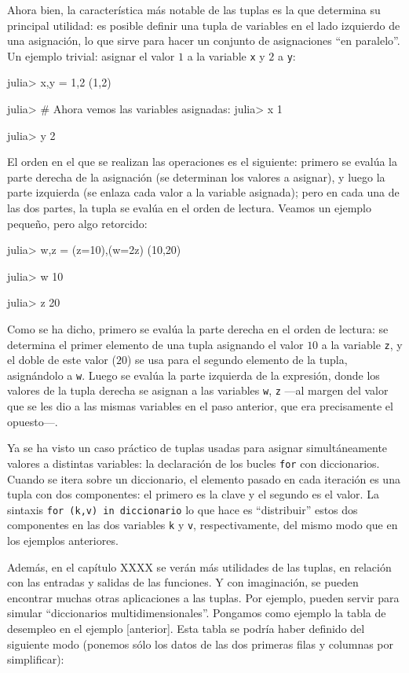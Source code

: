 ﻿\documentclass{article}
\newcommand{\code}{\texttt}
\begin{document}
{Ahora bien, la característica más notable de las tuplas es la que determina su principal utilidad: es posible definir una tupla de variables en el lado izquierdo de una asignación, lo que sirve para hacer un conjunto de asignaciones ``en paralelo''. Un ejemplo trivial: asignar el valor $1$ a la variable \code{x} y $2$ a \code{y}:

julia> x,y = 1,2
(1,2)

julia> # Ahora vemos las variables asignadas:
julia> x
1

julia> y
2

El orden en el que se realizan las operaciones es el siguiente: primero se evalúa la parte derecha de la asignación (se determinan los valores a asignar), y luego la parte izquierda (se enlaza cada valor a la variable asignada); pero en cada una de las dos partes, la tupla se evalúa en el orden de lectura. Veamos un ejemplo pequeño, pero algo retorcido:

julia> w,z = (z=10),(w=2z)
(10,20)

julia> w
10

julia> z
20

Como se ha dicho, primero se evalúa la parte derecha en el orden de lectura: se determina el primer elemento de una tupla asignando el valor $10$ a la variable \code{z}, y el doble de este valor ($20$) se usa para el segundo elemento de la tupla, asignándolo a \code{w}. Luego se evalúa la parte izquierda de la expresión, donde los valores de la tupla derecha se asignan a las variables \code{w}, \code{z} ---al margen del valor que se les dio a las mismas variables en el paso anterior, que era precisamente el opuesto---.

Ya se ha visto un caso práctico de tuplas usadas para asignar simultáneamente valores a distintas variables: la declaración de los bucles \code{for} con diccionarios. Cuando se itera sobre un diccionario, el elemento pasado en cada iteración es una tupla con dos componentes: el primero es la clave y el segundo es el valor. La sintaxis \code{for (k,v) in diccionario} lo que hace es ``distribuir'' estos dos componentes en las dos variables \code{k} y \code{v}, respectivamente, del mismo modo que en los ejemplos anteriores.

Además, en el capítulo XXXX se verán más utilidades de las tuplas, en relación con las entradas y salidas de las funciones. Y con imaginación, se pueden encontrar muchas otras aplicaciones a las tuplas. Por ejemplo, pueden servir para simular ``diccionarios multidimensionales''. Pongamos como ejemplo la tabla de desempleo en el ejemplo [anterior]. Esta tabla se podría haber definido del siguiente modo (ponemos sólo los datos de las dos primeras filas y columnas por simplificar):

}
\end{document}

